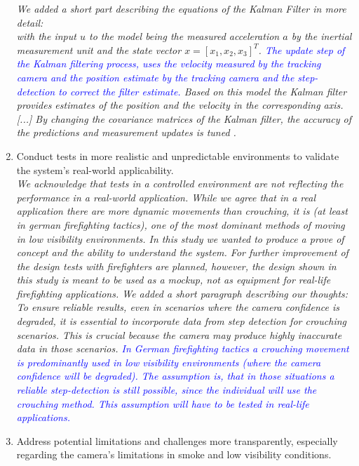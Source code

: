 \documentclass{article}
\begin{document}
\begin{enumerate}
\textit{We added a short part describing the equations of the Kalman Filter in more detail:}\\

\textit{with the input $u$ to the model being the measured acceleration $a$ by the inertial measurement unit and the state vector $x = [x_1, x_2, x_3]^T$. \textcolor{blue}{The update step of the Kalman filtering process, uses the velocity measured by the tracking camera and the position estimate by the tracking camera and the step-detection to correct the filter estimate.} Based on this model the Kalman filter provides estimates of the position and the velocity in the corresponding axis. 
[...]
By changing the covariance matrices of the Kalman filter, the accuracy of the predictions and measurement updates is tuned \cite{welch2006}.}

\item Conduct tests in more realistic and unpredictable environments to validate the system's real-world applicability.\\
\textit{We acknowledge that tests in a controlled environment are not reflecting the performance in a real-world application. While we agree that in a real application there are more dynamic movements than crouching, it is (at least in german firefighting tactics), one of the most dominant methods of moving in low visibility environments. In this study we wanted to produce a prove of concept and the ability to understand the system. For further improvement of the design tests with firefighters are planned, however, the design shown in this study is meant to be used as a mockup, not as equipment for real-life firefighting applications. We added a short paragraph describing our thoughts:}\\


\textit{To ensure reliable results, even in scenarios where the camera confidence is degraded, it is essential to incorporate data from step detection for crouching scenarios. This is crucial because the camera  may produce highly inaccurate data in those scenarios. \textcolor{blue}{In German firefighting tactics a crouching movement is predominantly used in low visibility environments (where the camera confidence will be degraded). The assumption is, that in those situations a reliable step-detection is still possible, since the individual will use the crouching method. This assumption will have to be tested in real-life applications.}}

\item Address potential limitations and challenges more transparently, especially regarding the camera's limitations in smoke and low visibility conditions.\\



\end{enumerate}
\end{document}
